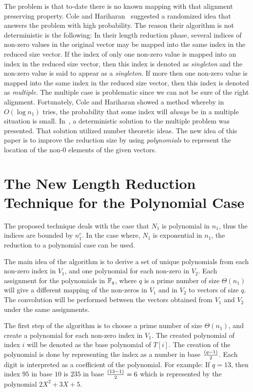 \documentclass[11pt,amssymb]{article}
\newcommand{\F}{{\Bbb F}}
\begin{document}
The problem is that to-date there is no known mapping with that
alignment preserving property. Cole and Hariharan~\cite{CH:02}
suggested a randomized idea that answers the problem with high
probability. The reason their algorithm is not deterministic is the
following:
In their length reduction phase, several indices of
non-zero values in the original vector may be mapped into the same
index in the reduced size vector. If the index of only one non-zero
value is mapped into an index in the reduced size vector, then this
index is denoted as {\it singleton} and the non-zero value is said
to appear as a {\it singleton}. If more then one non-zero value is
mapped into the same index in the reduced size vector, then this
index is denoted as {\it multiple}. The multiple case is problematic
since we can not be sure of the right alignment. Fortunately, Cole
and Hariharan showed a method whereby in $O(\log n_1)$ tries, the
probability that some index will {\em always} be in a multiple
situation is small. In~\cite{LR07}, a deterministic solution to the
multiple problem was presented. That solution utilized number
theoretic ideas. The new idea of this paper is to improve the
reduction size by using {\em polynomials} to represent the location of
the non-$0$ elements of the given vectors.


\section{The New Length Reduction Technique for the Polynomial
  Case}\label{s:length}

The proposed technique deals with the case that $N_1$ is polynomial
in $n_1$, thus the indices are bounded by $n_1^c$. In the case
where, $N_1$ is exponential in $n_1$, the reduction to a polynomial
case can be used.

The main idea of the algorithm is to derive a set of unique polynomials
from each non-zero index in $V_1$, and one polynomial for each non-zero
in $V_2$. Each assignment for the polynomials in $\F_q$, where $q$ is a
prime number of size $\Theta (n_1)$ will give a different mapping of
the non-zeros in $V_1$ and in $V_2$ to vectors of size $q$. The
convolution will be performed between the vectors obtained from
$V_1$ and $V_2$ under the same assignments.

The first step of the algorithm is to choose a prime number of size
$\Theta (n_1)$, and create a polynomial for each non-zero index in
$V_1$. The created polynomial of index $i$ will be denoted as the base
polynomial of $T[i]$. The creation of the polynomial is done by
representing the index as a number in base $(q-1) \over 2$. Each
digit is interpreted as a coefficient of the polynomial. For example:
If $q=13$, then index $95$ in base $10$ is $235$ in base ${(13-1)
\over 2}=6$ which is represented by the polynomial $2X^2+3X+5$.
\end{document}
